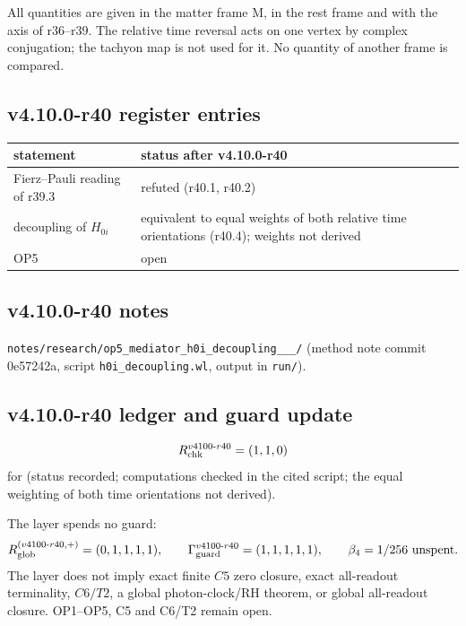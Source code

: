 All quantities are given in the matter frame M, in the rest frame and with the axis of r36--r39.  The relative time reversal acts on one vertex by
complex conjugation; the tachyon map is not used for it.  No quantity of another frame is compared.

\subsection*{v4.10.0-r40 register entries}
\label{subsec:v4100-r40-register}

\begin{center}
\small
\begin{tabular}{@{}>{\raggedright\arraybackslash}p{}>{\raggedright\arraybackslash}p{}@{}}
\toprule
statement & status after v4.10.0-r40\\
\midrule
Fierz--Pauli reading of r39.3 & refuted (r40.1, r40.2)\\
decoupling of \(H_{0i}\) & equivalent to equal weights of both relative time orientations (r40.4); weights not derived\\
OP5 & open\\
\bottomrule
\end{tabular}
\end{center}

\subsection*{v4.10.0-r40 notes}
\label{subsec:v4100-r40-notes}

\texttt{notes/\allowbreak research/\allowbreak op5\_\allowbreak mediator\_\allowbreak h0i\_\allowbreak decoupling\_\_\_/} (method note commit 0e57242a,
script \texttt{h0i\_\allowbreak decoupling.wl}, output in \texttt{run/}).

\subsection*{v4.10.0-r40 ledger and guard update}
\label{subsec:v4100-r40-ledger-guard}

\[
R_{\rm chk}^{v4100\text{-}r40}=(1,1,0)
\]
for (status recorded; computations checked in the cited script; the equal weighting of both time orientations not derived).

The layer spends no guard:
\[
R_{\rm glob}^{(v4100\text{-}r40,+)}=(0,1,1,1,1),
\qquad
\Gamma_{\rm guard}^{v4100\text{-}r40}=(1,1,1,1,1),
\qquad
\beta_4=1/256\ \text{unspent}.
\]
The layer does not imply exact finite \(C5\) zero closure, exact all-readout terminality, \(C6/T2\), a global photon-clock/RH theorem,
or global all-readout closure.  OP1--OP5, C5 and C6/T2 remain open.

